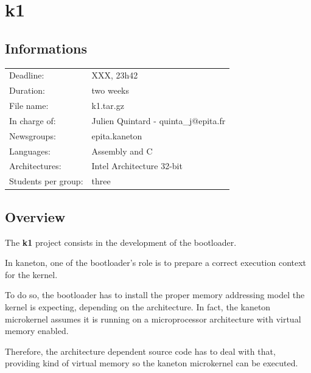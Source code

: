 
%
%

\section{k1}

%
%

\subsection{Informations}

\begin{tabular}{p{7cm}l}
Deadline: & XXX, 23h42 \\
Duration: & two weeks \\
File name: & k1.tar.gz \\
In charge of: & Julien Quintard - \small{quinta\_j@epita.fr} \\
Newsgroups: & epita.kaneton \\
Languages: & Assembly and C \\
Architectures: & Intel Architecture 32-bit \\
Students per group: & three \\
\end{tabular}

%
%

\subsection{Overview}

The \textbf{k1} project consists in the development of the bootloader.

In kaneton, one of the bootloader's role is to prepare a correct
execution context for the kernel.

To do so, the bootloader has to install the proper memory addressing model
the kernel is expecting, depending on the architecture. In fact, the
kaneton microkernel assumes it is running on a microprocessor architecture
with virtual memory enabled.

Therefore, the architecture dependent source code has to deal with that,
providing kind of virtual memory so the kaneton microkernel can be executed.

